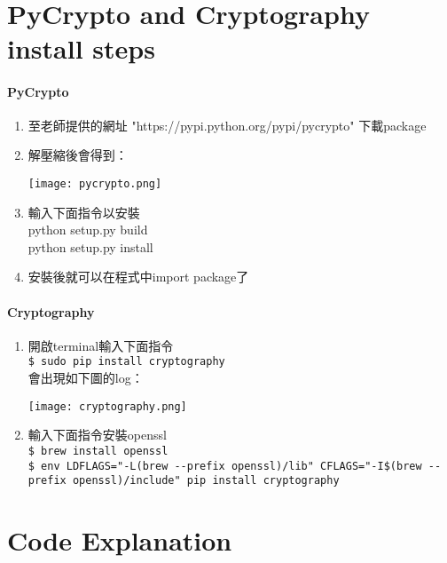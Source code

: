 \documentclass{article}
\title{
\vspace{2in}
\textmd{\textbf{\hmwkClass\ \\  \hmwkTitle}}\\
\vspace{0.1in}\large{\textit{\hmwkClassInstructor}}
\vspace{3in}
}
\author{\textbf{\hmwkAuthorName}}
\date{}
\begin{document}
\maketitle

\newpage

\section{PyCrypto and Cryptography install steps}

\paragraph*{PyCrypto}

\begin{enumerate}
\item 至老師提供的網址 "https://pypi.python.org/pypi/pycrypto" 下載package
\item 解壓縮後會得到：\medskip

\centerline{\texttt{[image: pycrypto.png]}}
\item 輸入下面指令以安裝\\
python setup.py build\\
python setup.py install
\item 安裝後就可以在程式中import package了
\end{enumerate}

\paragraph*{Cryptography}

\begin{enumerate}
\item 開啟terminal輸入下面指令\\
\verb|$ sudo pip install cryptography|\\
會出現如下圖的log：\newpage
\centerline{\texttt{[image: cryptography.png]}}
\item 輸入下面指令安裝openssl\\
\verb|$ brew install openssl|\\
\verb|$ env LDFLAGS="-L(brew --prefix openssl)/lib" CFLAGS="-I$(brew --prefix openssl)/include" pip install cryptography|
\end{enumerate}

\section{Code Explanation}
\end{document}

